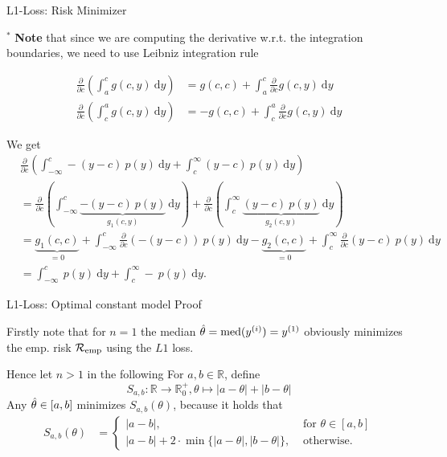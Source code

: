 \documentclass[11pt,compress,t,notes=noshow, xcolor=table]{beamer}
\begin{document}
\begin{frame2}[footnotesize]{L1-Loss: Risk Minimizer}

$^\ast$ \textbf{Note} that since we are computing the derivative w.r.t. the integration boundaries, we need to use Leibniz integration rule 

\begin{align*}
  \frac{\partial}{\partial c} (\int_a^c g(c, y) ~\text{d}y) &= g(c, c) + \int_a^c \frac{\partial}{\partial c} g(c, y) ~\text{d}y \\
  \frac{\partial}{\partial c} (\int_c^a g(c, y) ~\text{d}y) &= - g(c, c) + \int_c^a \frac{\partial}{\partial c} g(c, y) ~\text{d}y    
\end{align*}

We get 
\begin{align*}
&\frac{\partial}{\partial c} (\int_{-\infty}^c -(y - c)~p(y)~\text{d}y + \int_c^\infty (y - c)~p(y)~\text{d}y ) \\
&= \frac{\partial}{\partial c} (\int_{-\infty}^c \underbrace{-(y - c)~p(y)}_{g_1(c, y)}~\text{d}y) + \frac{\partial}{\partial c} (\int_c^\infty \underbrace{(y - c)~p(y)}_{g_2(c, y)}~\text{d}y ) \\
&= \underbrace{g_1(c, c)}_{=0} + \int_{-\infty}^c \frac{\partial}{\partial c}  (-(y - c))~p(y)~\text{d}y - \underbrace{g_2(c, c)}_{= 0} + \int_c^\infty \frac{\partial}{\partial c}  (y - c)~p(y)~\text{d}y \\
&= \int_{-\infty}^c  ~p(y)~\text{d}y + \int_c^\infty -~p(y)~\text{d}y. 
\end{align*}

\end{frame2}


\begin{framei}{L1-Loss: Optimal constant model Proof}

  \item Firstly note that for $n = 1$ the median $\hat{\theta} = \text{med}(y^{(i)}) = y^{(1)}$ obviously minimizes the emp. risk $\mathcal{R}_{\text{emp}}$ using the $L1$ loss. 



  \item Hence let $n > 1$ in the following For $a,b \in \mathbb{R}$, define 
  $$
    S_{a,b}:\mathbb{R} \rightarrow \mathbb{R}^+_0, \theta \mapsto |a- \theta| + |b-\theta|
  $$
  \vspace*{-0.3cm}
  Any $\hat{\theta} \in [a,b]$ minimizes $S_{a,b}(\theta)$, because it holds that
  \vspace*{-0.0cm}
  \begin{align*}
  S_{a,b}(\theta) &= \begin{cases}|a-b| ,& \text{ for } \theta \in [a,b]\\ |a-b| + 2\cdot\min\{|a-\theta|,|b-\theta|\}
  ,& \text{ otherwise. }\end{cases}
  \end{align*}


\end{framei}
\end{document}

